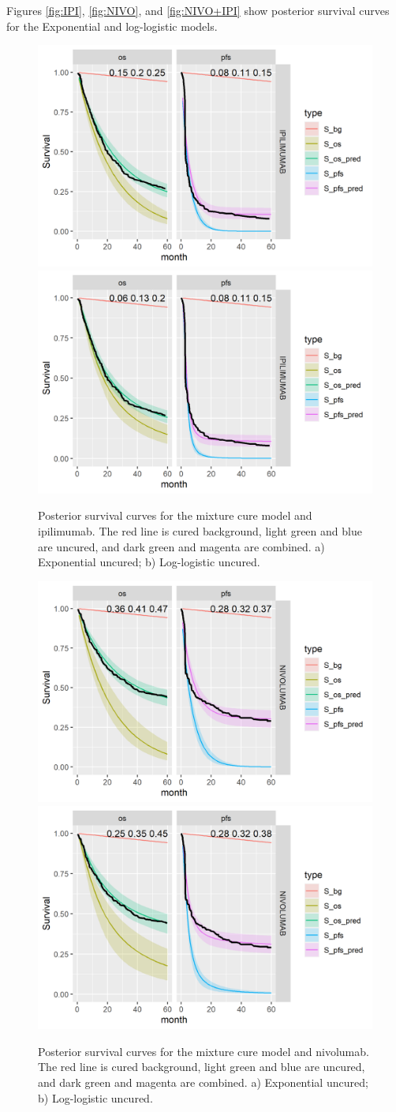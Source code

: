 \documentclass[
]{article}
\begin{document}
Figures \ref{fig:IPI}, \ref{fig:NIVO}, and \ref{fig:NIVO+IPI} show
posterior survival curves for the Exponential and log-logistic models.

\begin{figure}

{\centering \includegraphics[width=0.4\linewidth]{../plots/S_plots_exp_exp_cf hier_bg_fixed_IPILIMUMAB} \includegraphics[width=0.4\linewidth]{../plots/S_plots_loglogistic_loglogistic_cf hier_bg_fixed_IPILIMUMAB} 

}

\caption{\label{fig:IPI}Posterior survival curves for the mixture cure model and ipilimumab. The red line is cured background, light green and blue are uncured, and dark green and magenta are combined. a) Exponential uncured; b) Log-logistic uncured.}\label{fig:unnamed-chunk-3}
\end{figure}

\begin{figure}

{\centering \includegraphics[width=0.4\linewidth]{../plots/S_plots_exp_exp_cf hier_bg_fixed_NIVOLUMAB} \includegraphics[width=0.4\linewidth]{../plots/S_plots_loglogistic_loglogistic_cf hier_bg_fixed_NIVOLUMAB} 

}

\caption{\label{fig:NIVO}Posterior survival curves for the mixture cure model and nivolumab. The red line is cured background, light green and blue are uncured, and dark green and magenta are combined. a) Exponential uncured; b) Log-logistic uncured.}\label{fig:unnamed-chunk-4}
\end{figure}
\end{document}
